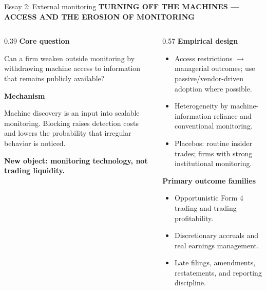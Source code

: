 \documentclass[aspectratio=169,10pt]{beamer}
\newcommand{\eyebrow}[1]{%
  {\color{accent}\fontsize{7.3}{9}\selectfont\bfseries\MakeUppercase{#1}}\par\vspace{0.10cm}%
}
\newcommand{\smallhead}[1]{%
  {\fontsize{11}{13}\selectfont\bfseries #1}\par\vspace{0.08cm}%
}
\newcommand{\bodytext}{\fontsize{9.4}{12.1}\selectfont}
\newcommand{\smalltext}{\fontsize{8.1}{10.2}\selectfont}
\begin{document}
\begin{frame}[t]{Essay 2: External monitoring}
\eyebrow{Turning Off the Machines --- access and the erosion of monitoring}

\begin{columns}[T,onlytextwidth]
  \begin{column}{0.39\textwidth}
    \smallhead{Core question}
    {\bodytext Can a firm weaken outside monitoring by withdrawing machine access to information that remains publicly available?}\par
    \vspace{0.20cm}
    \smallhead{Mechanism}
    {\bodytext Machine discovery is an input into scalable monitoring. Blocking raises detection costs and lowers the probability that irregular behavior is noticed.}\par
    \vspace{0.10cm}
    \colorbox{accentlight}{\parbox{0.92\linewidth}{\smalltext\bfseries New object: monitoring technology, not trading liquidity.}}
  \end{column}
  \begin{column}{0.57\textwidth}
    \smallhead{Empirical design}
    {\smalltext
    \begin{itemize}\setlength\itemsep{0.11cm}
      \item Access restrictions $\rightarrow$ managerial outcomes; use passive/vendor-driven adoption where possible.
      \item Heterogeneity by machine-information reliance and conventional monitoring.
      \item Placebos: routine insider trades; firms with strong institutional monitoring.
    \end{itemize}}
    \vspace{0.12cm}
    \smallhead{Primary outcome families}
    {\smalltext
    \begin{itemize}\setlength\itemsep{0.10cm}
      \item Opportunistic Form 4 trading and trading profitability.
      \item Discretionary accruals and real earnings management.
      \item Late filings, amendments, restatements, and reporting discipline.
    \end{itemize}}
  \end{column}
\end{columns}
\end{frame}
\end{document}
